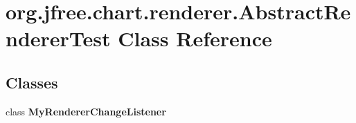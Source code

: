 \hypertarget{classorg_1_1jfree_1_1chart_1_1renderer_1_1_abstract_renderer_test}{}\section{org.\+jfree.\+chart.\+renderer.\+Abstract\+Renderer\+Test Class Reference}
\label{classorg_1_1jfree_1_1chart_1_1renderer_1_1_abstract_renderer_test}
\subsection*{Classes}
\begin{DoxyCompactItemize}
\item 
class {\bfseries My\+Renderer\+Change\+Listener}
\end{DoxyCompactItemize}
